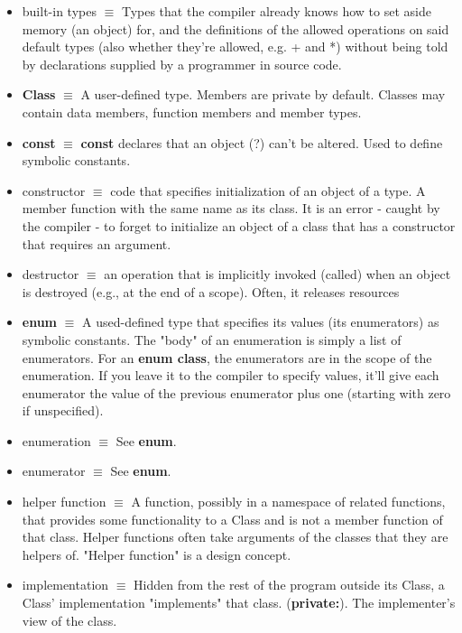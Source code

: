\documentclass[12pt]{article}
\begin{document}
\begin{itemize}
\item built-in types $\equiv$ Types that the compiler already knows how to set aside memory (an object) for, and the definitions of the allowed operations on said default types (also whether they're allowed, e.g. + and *) without being told by declarations supplied by a programmer in source code.

\item \textbf{Class} $\equiv$ A user-defined type. Members are private by default. Classes may contain data members, function members and member types.

\item \textbf{const} $\equiv$ \textbf{const} declares that an object (?) can't be altered. Used to define symbolic constants.

\item constructor $\equiv$ code that specifies initialization of an object of a type. A member function with the same name as its class. It is an error - caught by the compiler - to forget to initialize an object of a class that has a constructor that requires an argument.

\item destructor $\equiv$ an operation that is implicitly invoked (called) when an object is destroyed (e.g., at the end of a scope). Often, it releases resources

\item \textbf{enum} $\equiv$ A used-defined type that specifies its values (its enumerators) as symbolic constants. The "body" of an enumeration is simply a list of enumerators. For an \textbf{enum class}, the enumerators are in the scope of the enumeration. If you leave it to the compiler to specify values, it'll give each enumerator the value of the previous enumerator plus one (starting with zero if unspecified).

\item enumeration $\equiv$ See \textbf{enum}.

\item enumerator $\equiv$ See \textbf{enum}.

\item helper function $\equiv$ A function, possibly in a namespace of related functions, that provides some functionality to a Class and is not a member function of that class. Helper functions often take arguments of the classes that they are helpers of. "Helper function" is a design concept.

\item implementation $\equiv$ Hidden from the rest of the program outside its Class, a Class' implementation "implements" that class. (\textbf{private:}). The implementer's view of the class.


\end{itemize}
\end{document}
